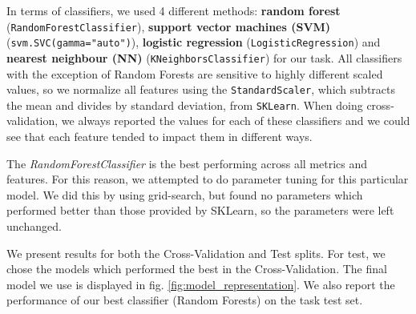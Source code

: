     In terms of classifiers, we used 4 different methods: \textbf{random forest} (\verb'RandomForestClassifier'), \textbf{support vector machines (SVM)} (\verb'svm.SVC(gamma="auto")'), \textbf{logistic regression} (\verb'LogisticRegression') and \textbf{nearest neighbour (NN)} (\verb'KNeighborsClassifier') for our task. All classifiers with the exception of Random Forests are sensitive to highly different scaled values, so we normalize all features using the \verb'StandardScaler', which subtracts the mean and divides by standard deviation, from \verb'SKLearn'. When doing cross-validation, we always reported the values for each of these classifiers and we could see that each feature tended to impact them in different ways.
    
    The \emph{RandomForestClassifier} is the best performing across all metrics and features. For this reason, we attempted to do parameter tuning for this particular model. We did this by using grid-search, but found no parameters which performed better than those provided by SKLearn, so the parameters were left unchanged.
    
    We present results for both the Cross-Validation and Test splits. For test, we chose the models which performed the best in the Cross-Validation. The final model we use is displayed in fig. \ref{fig:model_representation}. We also report the performance of our best classifier (Random Forests) on the task test set.
    
